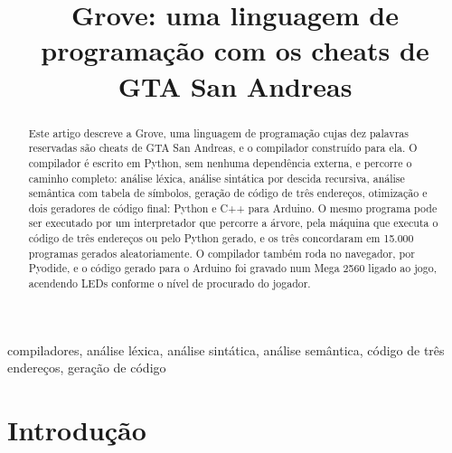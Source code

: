\documentclass[conference]{IEEEtran}
\begin{document}
\renewcommand\IEEEkeywordsname{Palavras-chave}

\title{Grove: uma linguagem de programação com os cheats de GTA San Andreas}

\author{
\and
{}
\and
{}
}

\maketitle

\begin{abstract}
Este artigo descreve a Grove, uma linguagem de programação cujas dez palavras reservadas são cheats de GTA San Andreas, e o compilador construído para ela. O compilador é escrito em Python, sem nenhuma dependência externa, e percorre o caminho completo: análise léxica, análise sintática por descida recursiva, análise semântica com tabela de símbolos, geração de código de três endereços, otimização e dois geradores de código final: Python e C++ para Arduino. O mesmo programa pode ser executado por um interpretador que percorre a árvore, pela máquina que executa o código de três endereços ou pelo Python gerado, e os três concordaram em 15.000 programas gerados aleatoriamente. O compilador também roda no navegador, por Pyodide, e o código gerado para o Arduino foi gravado num Mega 2560 ligado ao jogo, acendendo LEDs conforme o nível de procurado do jogador.
\end{abstract}

\begin{IEEEkeywords}
compiladores, análise léxica, análise sintática, análise semântica, código de três endereços, geração de código
\end{IEEEkeywords}

\section{Introdução}
\end{document}
